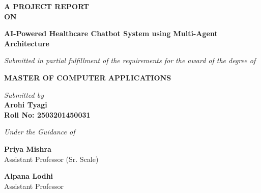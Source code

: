 \documentclass[12pt,a4paper]{report}
\begin{document}
\begin{titlepage}
    \begin{center}
        \vspace*{1cm}
        
        \textbf{\Large A PROJECT REPORT}\\
        \textbf{\Large ON}
        
        \vspace{1.5cm}
        
        \textbf{\LARGE AI-Powered Healthcare Chatbot System using Multi-Agent Architecture}
        
        \vspace{2cm}
        
        \textit{Submitted in partial fulfillment of the requirements for the award of the degree of}
        
        \vspace{0.5cm}
        
        \textbf{\Large MASTER OF COMPUTER APPLICATIONS}
        
        \vspace{1.5cm}
        
        \textit{Submitted by} \\
        \vspace{0.3cm}
        \textbf{Arohi Tyagi} \\
        \textbf{Roll No: 2503201450031}
        
        \vspace{2cm}
        
        \textit{Under the Guidance of}
        
        \vspace{0.5cm}
        \begin{minipage}{0.4\textwidth}
            \begin{center}
                \textbf{Priya Mishra} \\
                Assistant Professor (Sr. Scale)
            \end{center}
        \end{minipage}
        \hfill
        \begin{minipage}{0.4\textwidth}
            \begin{center}
                \textbf{Alpana Lodhi} \\
                Assistant Professor
            \end{center}
        \end{minipage}
        

\end{center}
\end{titlepage}
\end{document}
